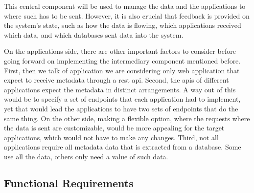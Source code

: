 This central component will be used to manage the data and the applications to where such has to be sent.
However, it is also crucial that feedback is provided on the system's state, such as how the data is flowing, which applications received which data, and which databases sent data into the system.


On the applications side, there are other important factors to consider before going forward on implementing the intermediary component mentioned before.
First, then we talk of application we are considering only web application that expect to receive metadata through a \gls{rest} \gls{api}.
Second, the \gls{api}s of different applications expect the metadata in distinct arrangements.
A way out of this would be to specify a set of endpoints that each application had to implement, yet that would lead the applications to have two sets of endpoints that do the same thing.
On the other side, making a flexible option, where the requests where the data is sent are customizable, would be more appealing for the target applications, which would not have to make any changes.
Third, not all applications require all metadata data that is extracted from a database.
Some use all the data, others only need a value of such data.

\subsection{Functional Requirements}

